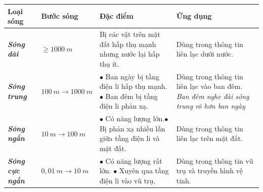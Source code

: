 \begin{longtable}{|p{}|p{}|p{}|p{}|}%
\hline
\textbf{Loại sóng}&\textbf{Bước sóng}&\textbf{Đặc điểm}&\textbf{Ứng dụng}\\\hline
\textbf{\textit{Sóng dài}}&$\geq 1000\ m$&Bị các vật trên mặt đất hấp thụ mạnh nhưng nước lại hấp thụ ít.&Dùng trong thông tin liên lạc dưới nước.\\\hline
\textbf{\textit{Sóng trung}}&$100\ m\to 1000\ m$&$\bullet$ Ban ngày bị tầng điện li hấp thụ mạnh.\newline
$\bullet$ Ban đêm bị tầng điện li phản xạ.&Dùng trong thông tin liên lạc vào ban đêm.\newline
\textit{Ban đêm nghe đài sóng trung rõ hơn ban ngày}\\\hline
\textbf{\textit{Sóng ngắn}}&$10\ m \to 100\ m$&$\bullet$ Có năng lượng lớn.\newline $\bullet$ Bị phản xạ nhiều lần giữa tầng điện li và mặt đất.& Dùng trong thông tin liên lạc trên mặt đất.
\\\hline
\textbf{\textit{Sóng cực ngắn}}&$0,01\ m\to 10\ m$&$\bullet$ Có năng lượng rất lớn. \newline $\bullet$ Xuyên qua tầng điện li vào vũ trụ.&Dùng trong thông tin vũ trụ và truyền hình vệ tinh.\\ \hline
\end{longtable}